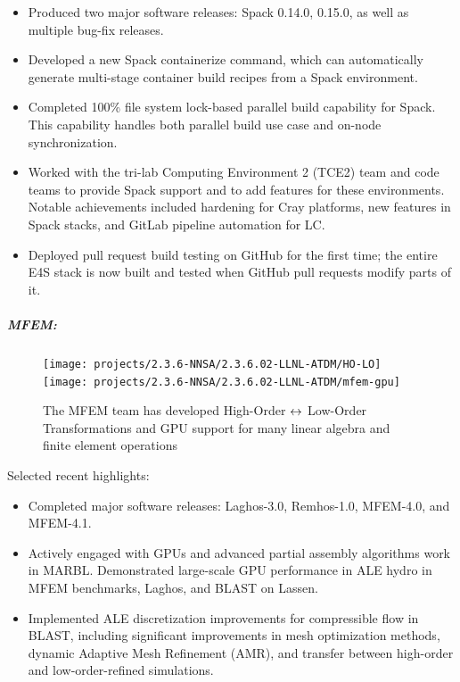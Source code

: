 \begin{itemize}
\item Produced two major software releases: Spack 0.14.0, 0.15.0, as well as multiple bug-fix releases.
\item Developed a new Spack containerize command, which can automatically generate multi-stage container build recipes from a Spack environment.
\item Completed 100\% file system lock-based parallel build capability for Spack. This capability handles both parallel build use case and on-node synchronization.
\item Worked with the tri-lab Computing Environment 2 (TCE2) team and code teams to provide Spack support and to add features for these environments. Notable achievements included hardening for Cray platforms, new features in Spack stacks, and GitLab pipeline automation for LC.
\item Deployed pull request build testing on GitHub for the first time; the entire E4S stack is now built and tested when GitHub pull requests modify parts of it.
\end{itemize}

\subparagraph{MFEM:}

\begin{figure}[tb]
\centering
\texttt{[image: projects/2.3.6-NNSA/2.3.6.02-LLNL-ATDM/HO-LO]}
\texttt{[image: projects/2.3.6-NNSA/2.3.6.02-LLNL-ATDM/mfem-gpu]}
\caption{The MFEM team has developed High-Order $\protect\leftrightarrow$ Low-Order Transformations and GPU support for many linear algebra and finite element operations}
\end{figure}

Selected recent highlights:
\begin{itemize}
\item Completed major software releases: Laghos-3.0, Remhos-1.0, MFEM-4.0, and MFEM-4.1. 
\item Actively engaged with GPUs and advanced partial assembly algorithms work in MARBL. Demonstrated large-scale GPU performance in ALE hydro in MFEM benchmarks, Laghos, and BLAST on Lassen. 
\item Implemented ALE discretization improvements for compressible flow in BLAST, including significant improvements in mesh optimization methods, dynamic Adaptive Mesh Refinement (AMR), and transfer between high-order and low-order-refined simulations. 

\end{itemize}

